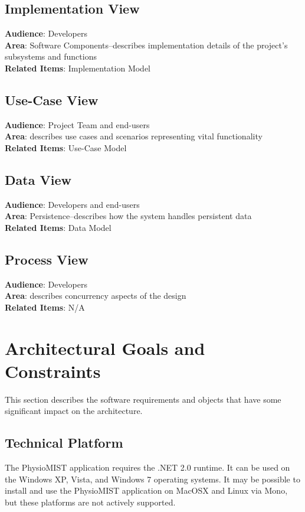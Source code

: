 \documentclass{article}
\begin{document}
\subsection{Implementation View}
\textbf{Audience}: Developers\\
\textbf{Area}: Software Components--describes implementation details of the project's subsystems and functions\\
\textbf{Related Items}: Implementation Model
\subsection{Use-Case View}
\textbf{Audience}: Project Team and end-users\\
\textbf{Area}: describes use cases and scenarios representing vital functionality\\
\textbf{Related Items}: Use-Case Model
\subsection{Data View}
\textbf{Audience}: Developers and end-users\\
\textbf{Area}: Persistence--describes how the system handles persistent data\\
\textbf{Related Items}: Data Model
\subsection{Process View}
\textbf{Audience}: Developers\\
\textbf{Area}: describes concurrency aspects of the design\\
\textbf{Related Items}: N/A

\section{Architectural Goals and Constraints}
This section describes the software requirements and objects that have some significant impact on the architecture.
\subsection{Technical Platform}
The PhysioMIST application requires the .NET 2.0 runtime. It can be used on the Windows XP, Vista, and Windows 7 operating systems. It may be possible to install and use the PhysioMIST application on MacOSX and Linux via Mono, but these platforms are not actively supported.
\end{document}
